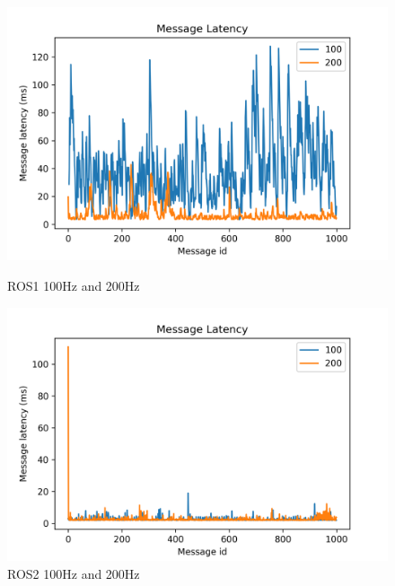 \documentclass{mproj}
\begin{document}
\begin{figure}
\begin{minipage}[h]{0.5\linewidth}
\centering
\includegraphics[width = 1\textwidth]{middle.png}
\caption{ROS1 100Hz and 200Hz}
\label{fig:side:a}
\end{minipage}%
\begin{minipage}[h]{0.5\linewidth}
\centering
\includegraphics[width = 1\textwidth]{middle1.png}
\caption{ROS2 100Hz and 200Hz}
\label{fig:side:b}
\end{minipage}
\end{figure}
\end{document}
